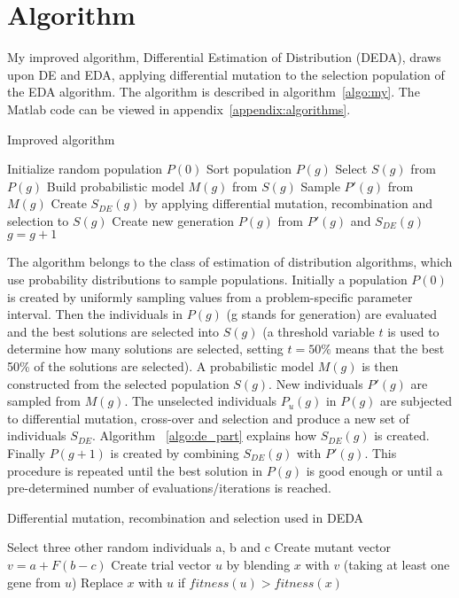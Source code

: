 \section{Algorithm}

My improved algorithm, Differential Estimation of Distribution (DEDA), draws upon DE and EDA, applying differential mutation to the selection population of the EDA algorithm. The algorithm is described in algorithm~\ref{algo:my}. The Matlab code can be viewed in appendix~\ref{appendix:algorithms}.

\begin{algorithm}[h]
  \caption{Improved algorithm}
  \label{algo:my}
    \begin{algorithmic}
      \State Initialize random population $P(0)$
      \Repeat
        \State Sort population $P(g)$
        \State Select $S(g)$ from $P(g)$
        \State Build probabilistic model $M(g)$ from $S(g)$
        \State Sample $P'(g)$ from $M(g)$
        \State Create $S_{DE}(g)$ by applying differential mutation, recombination and selection to $S(g)$
        \State Create new generation $P(g)$ from $P'(g)$ and $S_{DE}(g)$
        \State $g=g+1$
    \end{algorithmic}
\end{algorithm}

The algorithm belongs to the class of estimation of distribution algorithms, which use probability distributions to sample populations. Initially a population $P(0)$ is created by uniformly sampling values from a problem-specific parameter interval. Then the individuals in $P(g)$ (g stands for generation) are evaluated and the best solutions are selected into $S(g)$ (a threshold variable $t$ is used to determine how many solutions are selected, setting $t=50\%$ means that the best 50\% of the solutions are selected). A probabilistic model $M(g)$ is then constructed from the selected population $S(g)$. New individuals $P'(g)$ are sampled from $M(g)$. The unselected individuals $P_u(g)$ in $P(g)$ are subjected to differential mutation, cross-over and selection and produce a new set of individuals $S_{DE}$. Algorithm ~\ref{algo:de_part} explains how $S_{DE}(g)$ is created. Finally $P(g+1)$ is created by combining $S_{DE}(g)$ with $P'(g)$. This procedure is repeated until the best solution in $P(g)$ is good enough or until a pre-determined number of evaluations/iterations is reached.

\begin{algorithm}[h]
  \caption{Differential mutation, recombination and selection used in DEDA}
  \label{algo:de_part}
    \begin{algorithmic}
        \State Select three other random individuals a, b and c
        \State Create mutant vector $v=a+F(b-c)$
        \State Create trial vector $u$ by blending $x$ with $v$ (taking at least one gene from $u$)
        \State Replace $x$ with $u$ if $fitness(u) > fitness(x)$
      \EndFor
    \end{algorithmic}
\end{algorithm}

